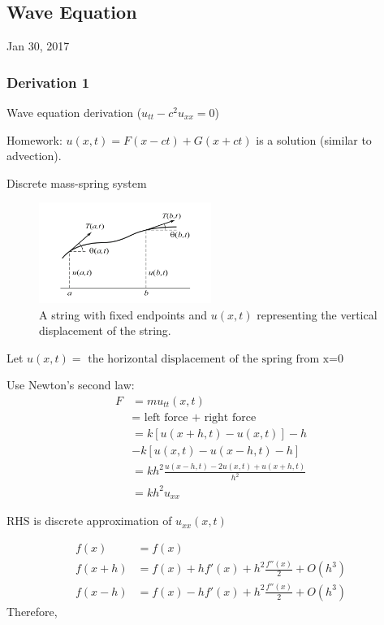 \documentclass[main.tex]{subfiles}
\begin{document}
\hrulefill{}
\subsection{Wave Equation}
Jan 30, 2017

\vspace{3mm}
\subsubsection{Derivation 1}
Wave equation derivation ($u_{tt} - c^2u_{xx} = 0$)

Homework: $u(x, t) = F(x - ct) + G(x + ct)$ is a solution (similar to advection).

Discrete mass-spring system

\begin{figure}[ht]
        \centering
        \includegraphics[width=0.5\textwidth]{wave-eq-string}
        \caption{A string with fixed endpoints and $u(x, t)$ representing the vertical displacement of the string.}
        \label{fig:string-wave}
\end{figure}

Let $u(x, t) = \textrm{ the horizontal displacement of the spring from x=0}$

Use Newton's second law:
\begin{align}
F &= mu_{tt}(x, t) \\
  &= \textrm{ left force + right force} \\
  &= k\left[u(x+h, t) - u(x, t)\right] - h \\
  &- k\left[u(x, t) - u(x-h, t) - h\right] \\
  &= kh^2\frac{u(x-h, t) - 2u(x, t) + u(x+h, t)}{h^2} \\
  &= kh^2 u_{xx}
\end{align}

RHS is discrete approximation of $u_{xx}(x, t)$

\begin{align}
f(x) &= f(x) \\
f(x + h) &= f(x) + hf'(x) + h^2\frac{f''(x)}{2} + O(h^3) \\
f(x - h) &= f(x) - hf'(x) + h^2\frac{f''(x)}{2} + O(h^3)
\end{align}
Therefore,
\end{document}
